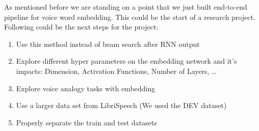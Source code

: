 
As mentioned before we are standing on a point that we just built end-to-end pipeline for voice word embedding. This could be the start of a research project. Following could be the next steps for the project: 
\begin{enumerate}
\item Use this method instead of beam search after RNN output 
\item Explore different hyper parameters on the embedding network and it's impacts: Dimension, Activation Functions, Number of Layers, \ldots
\item Explore voice analogy tasks with embedding 
\item Use a larger data set from LibriSpeech (We used the DEV dataset)
\item Properly separate the train and test datasets
\end{enumerate}
